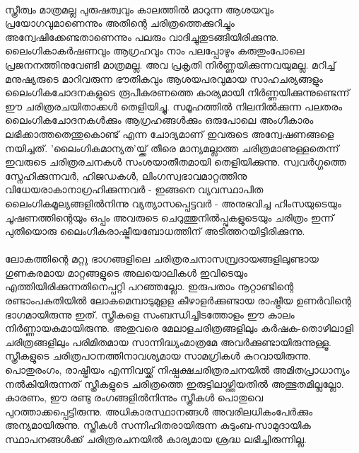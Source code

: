 \label{ch1box5} %
\begin{tcolorbox}[%
  breakable, %
  arc=0mm, 
  left=1pt, right = 1pt, 
  boxrule=0mm,
  colback = {blue!10}, %
] 
{\paragraph{}സ്ത്രീത്വം മാത്രമല്ല പുരുഷത്വവും കാലത്തിൽ മാറുന്ന ആശയവും പ്രയോഗവുമാണെന്നും അതിന്റെ ചരിത്രത്തെക്കുറിച്ചും അന്വേഷിക്കേണ്ടതാണെന്നും പലരും വാദിച്ചുതുടങ്ങിയിരിക്കുന്നു. ലൈംഗികാകർഷണവും ആഗ്രഹവും നാം പലപ്പോഴും കരുതുംപോലെ പ്രജനനത്തിനുവേണ്ടി മാത്രമല്ല. അവ പ്രകൃതി നിർണ്ണയിക്കുന്നവയുമല്ല. മറിച്ച് മനുഷ്യരുടെ മാറിവരുന്ന ഭൗതികവും ആശയപരവുമായ സാഹചര്യങ്ങളും ലൈംഗികചോദനകളുടെ രൂപീകരണത്തെ കാര്യമായി നിർണ്ണയിക്കുന്നുണ്ടെന്ന് ഈ ചരിത്രരചയിതാക്കൾ തെളിയിച്ചു. സമൂഹത്തിൽ നിലനിൽക്കുന്ന പലതരം ലൈംഗികചോദനകൾക്കും ആഗ്രഹങ്ങൾക്കും ഒരുപോലെ അംഗീകാരം ലഭിക്കാത്തതെന്തുകൊണ്ട് എന്ന ചോദ്യമാണ് ഇവരുടെ അന്വേഷണങ്ങളെ നയിച്ചത്. 'ലൈംഗികമാന്യത'യ്ക്ക് തീരെ മാന്യമല്ലാത്ത ചരിത്രമാണുള്ളതെന്ന് ഇവരുടെ ചരിത്രരചനകൾ സംശയാതീതമായി തെളിയിക്കുന്നു. സ്വവർഗ്ഗത്തെ സ്നേഹിക്കുന്നവർ, ഹിജഡകൾ, ലിംഗസ്വഭാവമാറ്റത്തിനു വിധേയരാകാനാഗ്രഹിക്കുന്നവർ - ഇങ്ങനെ വ്യവസ്ഥാപിത ലൈംഗികമൂല്യങ്ങളിൽനിന്നു വ്യത്യാസപ്പെട്ടവർ - അനുഭവിച്ച ഹിംസയുടെയും ചൂഷണത്തിന്റെയും ഒപ്പം അവരുടെ ചെറുത്തുനിൽപ്പുകളുടെയും ചരിത്രം ഇന്ന് പുതിയൊരു ലൈംഗികരാഷ്ട്രീയബോധത്തിന് അടിത്തറയിട്ടിരിക്കുന്നു.}
\end{tcolorbox}


\paragraph{}	ലോകത്തിന്റെ മറ്റു ഭാഗങ്ങളിലെ ചരിത്രരചനാസമ്പ്രദായങ്ങളിലുണ്ടായ ഗുണകരമായ മാറ്റങ്ങളുടെ അലയൊലികൾ ഇവിടെയും എത്തിയിരിക്കുന്നതിനെപ്പറ്റി പറഞ്ഞല്ലോ. ഇരുപതാം നൂറ്റാണ്ടിന്റെ രണ്ടാംപകുതിയിൽ ലോകമെമ്പാടുമുളള കീഴാളർക്കുണ്ടായ രാഷ്ട്രീയ ഉണർവിന്റെ ഭാഗമായിരുന്നു ഇത്. സ്ത്രീകളെ സംബന്ധിച്ചിടത്തോളം ഈ കാലം നിർണ്ണായകമായിരുന്നു. അതുവരെ മേലാളചരിത്രങ്ങളിലും കർഷക-തൊഴിലാളി ചരിത്രങ്ങളിലും പരിമിതമായ സാന്നിദ്ധ്യംമാത്രമേ അവർക്കുണ്ടായിരുന്നുള്ളൂ. സ്ത്രീകളുടെ ചരിത്രപഠനത്തിനാവശ്യമായ സാമഗ്രികൾ കുറവായിരുന്നു. പൊതുരംഗം, രാഷ്ട്രീയം എന്നിവയ്ക്ക് നിഷ്പക്ഷചരിത്രരചനയിൽ അമിതപ്രാധാന്യം നൽകിയിരുന്നത് സ്ത്രീകളുടെ ചരിത്രത്തെ ഇരുട്ടിലാഴ്ത്തിയതിൽ അത്ഭുതമില്ലല്ലോ. കാരണം, ഈ രണ്ടു രംഗങ്ങളിൽനിന്നും സ്ത്രീകൾ പൊതുവെ പുറത്താക്കപ്പെട്ടിരുന്നു. അധികാരസ്ഥാനങ്ങൾ അവരിലധികംപേർക്കും അന്യമായിരുന്നു. സ്ത്രീകൾ സന്നിഹിതരായിരുന്ന കുടുംബ-സാമുദായിക സ്ഥാപനങ്ങൾക്ക് ചരിത്രരചനയിൽ കാര്യമായ ശ്രദ്ധ ലഭിച്ചിരുന്നില്ല.

